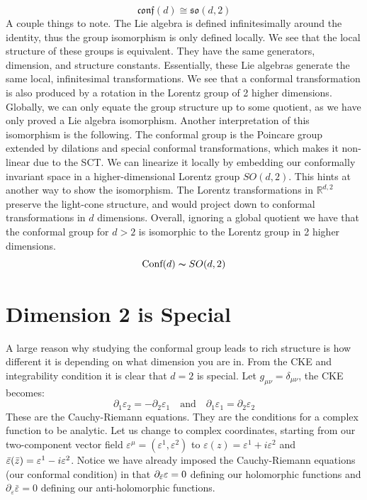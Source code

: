 \documentclass{article}
\begin{document}
\begin{equation}
    \mathfrak{conf}(d) \cong \mathfrak{so}(d,2)
\end{equation}
A couple things to note. The Lie algebra is defined infinitesimally around the identity, thus the group isomorphism is only defined locally. We see that the local structure of these groups is equivalent. They have the same generators, dimension, and structure constants. Essentially, these Lie algebras generate the same local, infinitesimal transformations. We see that a conformal transformation is also produced by a rotation in the Lorentz group of 2 higher dimensions. Globally, we can only equate the group structure up to some quotient, as we have only proved a Lie algebra isomorphism. Another interpretation of this isomorphism is the following. The conformal group is the Poincare group extended by dilations and special conformal transformations, which makes it non-linear due to the SCT. We can linearize it locally by embedding our conformally invariant space in a higher-dimensional Lorentz group $SO(d,2)$. This hints at another way to show the isomorphism. The Lorentz transformations in $\mathds{R}^{d,2}$ preserve the light-cone structure, and would project down to conformal transformations in $d$ dimensions. Overall, ignoring a global quotient we have that the conformal group for $d>2$ is isomorphic to the Lorentz group in 2 higher dimensions. 
\begin{equation}
    \text{Conf}(d) \thicksim SO(d,2)
\end{equation}

\section{Dimension 2 is Special}
A large reason why studying the conformal group leads to rich structure is how different it is depending on what dimension you are in. From the CKE and integrability condition it is clear that $ d = 2$ is special. Let $g_{\mu\nu} = \delta_{\mu\nu}$, the CKE becomes: 
\begin{equation}
    \partial_1\varepsilon_2 = -\partial_2\varepsilon_1 \quad\text{and} \quad  \partial_1\varepsilon_1 = \partial_2\varepsilon_2
\end{equation}
These are the Cauchy-Riemann equations. They are the conditions for a complex function to be analytic. Let us change to complex coordinates, starting from our two-component vector field $\varepsilon^\mu = (\varepsilon^1,\varepsilon^2)$ to $\varepsilon(z) = \varepsilon^1 + i\varepsilon^2$ and $\Bar{\varepsilon}(\Bar{z}) = \varepsilon^1 - i\varepsilon^2$. Notice we have already imposed the Cauchy-Riemann equations (our conformal condition) in that $\partial_{\Bar{\varepsilon}}\varepsilon=0$ defining our holomorphic functions and $\partial_{\varepsilon}\bar{\varepsilon}=0$ defining our anti-holomorphic functions.
\end{document}
